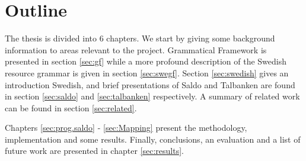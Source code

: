 \documentclass{report}
\begin{document}
\newpage %
\section{Outline}
The thesis is divided into 6 chapters. We start by giving some background
information to areas relevant to the project. %
Grammatical Framework is presented in section \ref{sec:gf} while a more profound
description of the Swedish resource grammar is given in section \ref{sec:swegf}.
Section \ref{sec:swedish} gives an introduction Swedish, and
brief presentations of Saldo and Talbanken are found in section \ref{sec:saldo} and
\ref{sec:talbanken} respectively.
A summary of related work can be found in section \ref{sec:related}.

Chapters \ref{sec:prog.saldo} - \ref{sec:Mapping} present the methodology,
implementation and some results. Finally, conclusions, an evaluation and a list
of future work are presented in chapter \ref{sec:results}.





\end{document}
